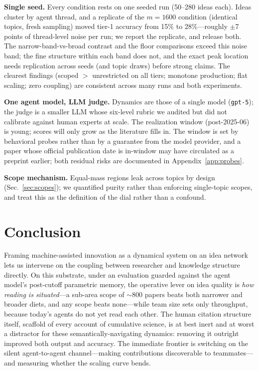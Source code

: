 \documentclass{article} %
\begin{document}
\textbf{Single seed.} Every condition rests on one seeded run
(50--280 ideas each). Ideas cluster by agent thread, and a replicate of
the $m{=}1600$ condition (identical topics, fresh sampling) moved
tier-1 accuracy from 15\% to 28\%---roughly $\pm$7 points of
thread-level noise per run; we report the replicate, and release both.
The narrow-band-vs-broad contrast and the floor comparisons exceed this
noise band; the fine structure within each band does not, and the exact
peak location needs replication across seeds (and topic draws) before
strong claims. The clearest findings (scoped $>$ unrestricted on all tiers;
monotone production; flat scaling; zero coupling) are consistent across
many runs and both experiments.

\textbf{One agent model, LLM judge.} Dynamics are those of a single
model (\texttt{gpt-5}); the judge is a smaller LLM whose six-level
rubric we audited but did not calibrate against human experts at scale.
The realization window (post-2025-06) is young; scores will only grow
as the literature fills in. The window is set by behavioral probes
rather than by a guarantee from the model provider, and a paper whose
official publication date is in-window may have circulated as a
preprint earlier; both residual risks are documented in
Appendix~\ref{app:probes}.

\textbf{Scope mechanism.} Equal-mass regions leak across topics by
design (Sec.~\ref{sec:scopes}); we quantified purity rather than
enforcing single-topic scopes, and treat this as the definition of the
dial rather than a confound.

\section{Conclusion}

Framing machine-assisted innovation as a dynamical system on an idea
network lets us intervene on the coupling between researcher and
knowledge structure directly. On this substrate, under an evaluation guarded against the agent
model's post-cutoff parametric memory, the operative lever on idea
quality is \emph{how reading is situated}---a sub-area scope of
$\sim$800 papers beats both narrower and broader diets, and any scope
beats none---while team size sets only throughput, because today's
agents do not yet read each other. The human citation structure itself,
scaffold of every account of cumulative science, is at best inert and at
worst a distractor for these semantically-navigating dynamics: removing
it outright improved both output and accuracy. The immediate frontier is
switching on the silent agent-to-agent channel---making contributions
discoverable to teammates---and measuring whether the scaling curve
bends.
\end{document}
